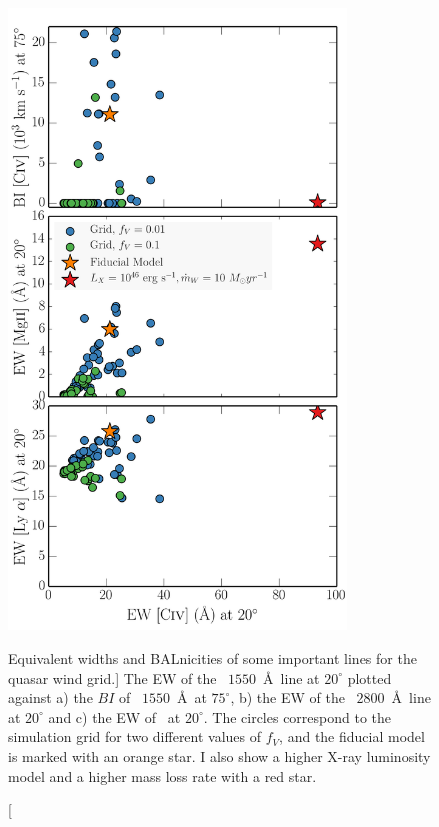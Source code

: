\begin{figure}
\centering
\includegraphics[width=0.8\textwidth]
{figures/06-agnpaper/thesis_c4_grid.png}
\caption
[Equivalent widths and BALnicities of some important lines for the quasar wind grid.]
{
The EW of the \civ~$1550$~\AA\ line at $20^\circ$ plotted against a) the 
$BI$ of \civ~$1550$~\AA\ at $75^\circ$, b) the EW of the \mg~$2800$~\AA\ line 
at $20^\circ$ and c) the EW of \la\ at $20^\circ$. The circles correspond 
to the simulation grid for two different values of $f_V$, and the fiducial 
model is marked with an orange star. 
I also show a higher X-ray luminosity model and a higher mass loss rate
with a red star.
}
\label{fig:grid}
\end{figure}

